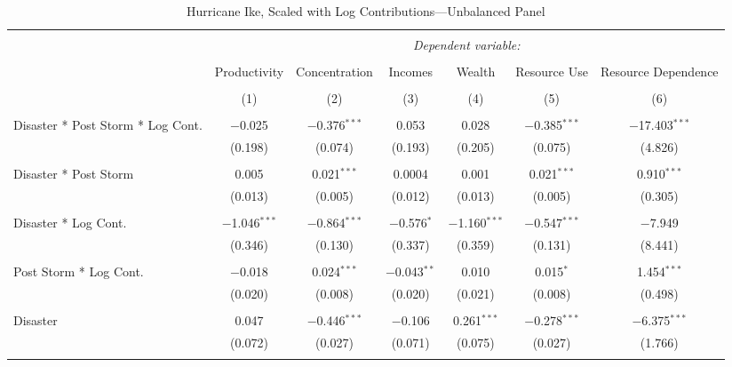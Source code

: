 
\begin{table}[!htbp] \centering 
  \caption{Hurricane Ike, Scaled with Log Contributions---Unbalanced Panel} 
  \label{} 
\footnotesize 
\begin{tabular}{@{\extracolsep{5pt}}lcccccc} 
\\[-1.8ex]\hline 
\hline \\[-1.8ex] 
 & \multicolumn{6}{c}{\textit{Dependent variable:}} \\ 
\cline{2-7} 
\\[-1.8ex] & Productivity & Concentration & Incomes & Wealth & Resource Use & Resource Dependence \\ 
\\[-1.8ex] & (1) & (2) & (3) & (4) & (5) & (6)\\ 
\hline \\[-1.8ex] 
 Disaster * Post Storm * Log Cont. & $-$0.025 & $-$0.376$^{***}$ & 0.053 & 0.028 & $-$0.385$^{***}$ & $-$17.403$^{***}$ \\ 
  & (0.198) & (0.074) & (0.193) & (0.205) & (0.075) & (4.826) \\ 
  & & & & & & \\ 
 Disaster * Post Storm & 0.005 & 0.021$^{***}$ & 0.0004 & 0.001 & 0.021$^{***}$ & 0.910$^{***}$ \\ 
  & (0.013) & (0.005) & (0.012) & (0.013) & (0.005) & (0.305) \\ 
  & & & & & & \\ 
 Disaster * Log Cont. & $-$1.046$^{***}$ & $-$0.864$^{***}$ & $-$0.576$^{*}$ & $-$1.160$^{***}$ & $-$0.547$^{***}$ & $-$7.949 \\ 
  & (0.346) & (0.130) & (0.337) & (0.359) & (0.131) & (8.441) \\ 
  & & & & & & \\ 
 Post Storm *  Log Cont. & $-$0.018 & 0.024$^{***}$ & $-$0.043$^{**}$ & 0.010 & 0.015$^{*}$ & 1.454$^{***}$ \\ 
  & (0.020) & (0.008) & (0.020) & (0.021) & (0.008) & (0.498) \\ 
  & & & & & & \\ 
 Disaster & 0.047 & $-$0.446$^{***}$ & $-$0.106 & 0.261$^{***}$ & $-$0.278$^{***}$ & $-$6.375$^{***}$ \\ 
  & (0.072) & (0.027) & (0.071) & (0.075) & (0.027) & (1.766) \\ 
  & & & & & & \\ 

\end{tabular}
\end{table}
